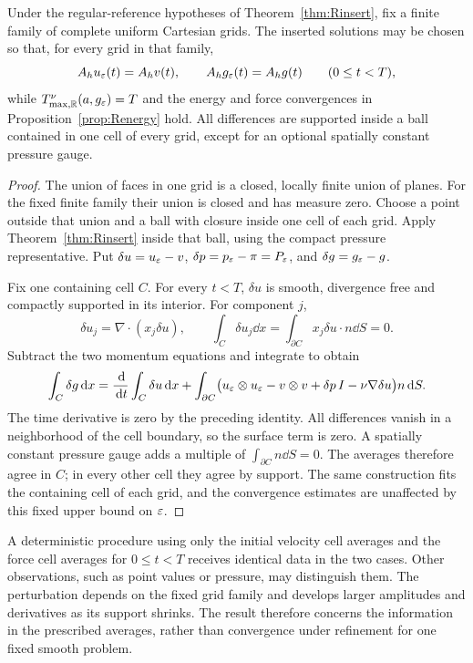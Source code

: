 \begin{theorem}\label{thm:Rgrid}
Under the regular-reference hypotheses of Theorem~\ref{thm:Rinsert}, fix a finite family of complete uniform Cartesian grids. The inserted solutions may be chosen so that, for every grid in that family,
\[
 A_hu_\varepsilon(t)=A_hv(t),\qquad A_hg_\varepsilon(t)=A_hg(t)
 \qquad(0\le t<T),
\]
while $T^\nu_{\max,\mathbb R}(a,g_\varepsilon)=T$ and the energy and force convergences in Proposition~\ref{prop:Renergy} hold. All differences are supported inside a ball contained in one cell of every grid, except for an optional spatially constant pressure gauge.
\end{theorem}
\begin{proof}
The union of faces in one grid is a closed, locally finite union of planes. For the fixed finite family their union is closed and has measure zero. Choose a point outside that union and a ball with closure inside one cell of each grid. Apply Theorem~\ref{thm:Rinsert} inside that ball, using the compact pressure representative. Put $\delta u=u_\varepsilon-v$, $\delta p=p_\varepsilon-\pi=P_\varepsilon$, and $\delta g=g_\varepsilon-g$.

Fix one containing cell $C$. For every $t<T$, $\delta u$ is smooth, divergence free and compactly supported in its interior. For component $j$,
\[
 \delta u_j=\nabla\cdot(x_j\delta u),\qquad
 \int_C\delta u_j\dd x=\int_{\partial C}x_j\delta u\cdot n\dd S=0.
\]
Subtract the two momentum equations and integrate to obtain
\begin{equation}\label{eq:gridforce}
 \int_C\delta g\,\mathrm d x
 =\frac{\,\mathrm d}{\,\mathrm d t}\int_C\delta u\,\mathrm d x
 +\int_{\partial C}\bigl(u_\varepsilon\otimes u_\varepsilon-v\otimes v
                         +\delta p\,I-\nu\nabla\delta u\bigr)n\,\mathrm d S.
\end{equation}
The time derivative is zero by the preceding identity. All differences vanish in a neighborhood of the cell boundary, so the surface term is zero. A spatially constant pressure gauge adds a multiple of $\int_{\partial C}n\dd S=0$. The averages therefore agree in $C$; in every other cell they agree by support. The same construction fits the containing cell of each grid, and the convergence estimates are unaffected by this fixed upper bound on $\varepsilon$.
\end{proof}

A deterministic procedure using only the initial velocity cell averages
and the force cell averages for $0\le t<T$ receives identical data in the
two cases. Other observations, such as point values or pressure, may
distinguish them. The perturbation depends on the fixed grid family and
develops larger amplitudes and derivatives as its support shrinks. The
result therefore concerns the information in the prescribed averages,
rather than convergence under refinement for one fixed smooth problem.
